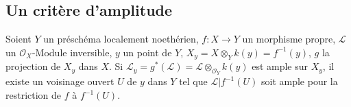 
\subsection{Un critère d'amplitude}

\begin{theorem}[4.7.1]
\label{III.4.7.1-fr}
Soient $Y$ un préschéma localement noethérien, $f:X\to Y$ un morphisme
propre, $\mathcal L$ un $\mathcal O_X$-Module inversible, $y$ un point de
$Y$, $X_y=X\otimes_Yk(y)=f^{-1}(y)$, $g$ la projection de $X_y$ dans $X$.
Si $\mathcal L_y=g^*(\mathcal L)=\mathcal L\otimes_{\mathcal O_Y}k(y)$ est
ample sur $X_y$, il existe un voisinage ouvert $U$ de $y$ dans $Y$ tel que
$\mathcal L|f^{-1}(U)$ soit ample pour la restriction de $f$ à $f^{-1}(U)$.
\end{theorem}

